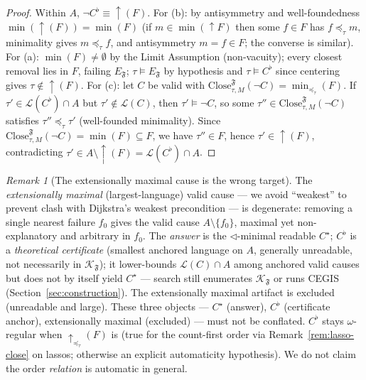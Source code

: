 \documentclass[11pt]{article}
\theoremstyle{remark}
\newtheorem{remark}{Remark}
\newcommand{\Close}{\mathrm{Close}}
\newcommand{\Lang}{\mathcal{L}}
\newcommand{\Frame}{\mathfrak{F}}
\begin{document}
\begin{proof}
Within \(A\), \(\neg C^{\flat}\equiv\uparrow(F)\). For (b): by antisymmetry and
well-foundedness \(\min(\uparrow(F))=\min(F)\) (if \(m\in\min(\uparrow F)\) then
some \(f\in F\) has \(f\preceq_\tau m\), minimality gives \(m\preceq_\tau f\), and
antisymmetry \(m=f\in F\); the converse is similar). For (a): \(\min(F)\neq
\emptyset\) by the Limit Assumption (non-vacuity); every closest removal lies in
\(F\), failing \(E_{\Frame}\); \(\tau\models E_{\Frame}\) by hypothesis and
\(\tau\models C^{\flat}\) since centering gives \(\tau\notin\uparrow(F)\). For (c):
let \(C\) be valid with \(\Close_{\tau,M}^{\Frame}(\neg C)=\min_{\preceq_\tau}(F)\).
If \(\tau'\in\Lang(C^{\flat})\cap A\) but \(\tau'\notin\Lang(C)\), then
\(\tau'\models\neg C\), so some \(\tau''\in\Close_{\tau,M}^{\Frame}(\neg C)\)
satisfies \(\tau''\preceq_\tau\tau'\) (well-founded minimality). Since
\(\Close_{\tau,M}^{\Frame}(\neg C)=\min(F)\subseteq F\), we have \(\tau''\in F\),
hence \(\tau'\in\uparrow(F)\), contradicting
\(\tau'\in A\setminus\uparrow(F)=\Lang(C^{\flat})\cap A\).
\end{proof}

\begin{remark}[The extensionally maximal cause is the wrong target]
\label{rem:weakest-degenerate}
The \emph{extensionally maximal} (largest-language) valid cause --- we avoid
``weakest'' to prevent clash with Dijkstra's weakest precondition --- is
degenerate: removing a single nearest failure \(f_0\) gives the valid cause
\(A\setminus\{f_0\}\), maximal yet non-explanatory and arbitrary in \(f_0\). The
\emph{answer} is the \(\triangleleft\)-minimal readable \(C^\star\); \(C^{\flat}\)
is a \emph{theoretical certificate} (smallest anchored language on \(A\), generally
unreadable, not necessarily in \(\mathcal{K}_{\Frame}\)); it lower-bounds
\(\Lang(C)\cap A\) among anchored valid causes but does not by itself yield
\(C^\star\) --- search still enumerates \(\mathcal{K}_{\Frame}\) or runs CEGIS
(Section~\ref{sec:construction}). The extensionally maximal artifact is excluded
(unreadable and large). These three objects --- \(C^\star\) (answer), \(C^{\flat}\)
(certificate anchor), extensionally maximal (excluded) --- must not be conflated. \(C^{\flat}\) stays
\(\omega\)-regular when \(\uparrow_{\preceq_\tau}(F)\) is (true for the count-first
order via Remark~\ref{rem:lasso-close} on lassos; otherwise an explicit
automaticity hypothesis). We do not claim the order \emph{relation} is automatic in
general.
\end{remark}
\end{document}
